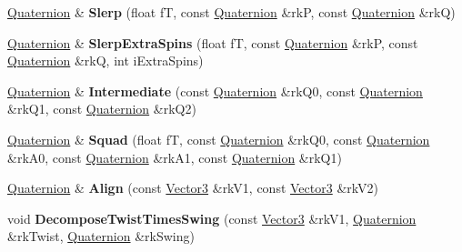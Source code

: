 \begin{DoxyCompactItemize}
\item 
\hyperlink{class_magnum_1_1_quaternion}{Quaternion} \& {\bfseries Slerp} (float fT, const \hyperlink{class_magnum_1_1_quaternion}{Quaternion} \&rkP, const \hyperlink{class_magnum_1_1_quaternion}{Quaternion} \&rkQ)\hypertarget{class_magnum_1_1_quaternion_af89b7c1613042ea126c8ff2a08284bac}{}\label{class_magnum_1_1_quaternion_af89b7c1613042ea126c8ff2a08284bac}

\item 
\hyperlink{class_magnum_1_1_quaternion}{Quaternion} \& {\bfseries Slerp\+Extra\+Spins} (float fT, const \hyperlink{class_magnum_1_1_quaternion}{Quaternion} \&rkP, const \hyperlink{class_magnum_1_1_quaternion}{Quaternion} \&rkQ, int i\+Extra\+Spins)\hypertarget{class_magnum_1_1_quaternion_a6c5399620b6a242c6e46f4db73788404}{}\label{class_magnum_1_1_quaternion_a6c5399620b6a242c6e46f4db73788404}

\item 
\hyperlink{class_magnum_1_1_quaternion}{Quaternion} \& {\bfseries Intermediate} (const \hyperlink{class_magnum_1_1_quaternion}{Quaternion} \&rk\+Q0, const \hyperlink{class_magnum_1_1_quaternion}{Quaternion} \&rk\+Q1, const \hyperlink{class_magnum_1_1_quaternion}{Quaternion} \&rk\+Q2)\hypertarget{class_magnum_1_1_quaternion_a7c13c49551714c6366075112eccaebf3}{}\label{class_magnum_1_1_quaternion_a7c13c49551714c6366075112eccaebf3}

\item 
\hyperlink{class_magnum_1_1_quaternion}{Quaternion} \& {\bfseries Squad} (float fT, const \hyperlink{class_magnum_1_1_quaternion}{Quaternion} \&rk\+Q0, const \hyperlink{class_magnum_1_1_quaternion}{Quaternion} \&rk\+A0, const \hyperlink{class_magnum_1_1_quaternion}{Quaternion} \&rk\+A1, const \hyperlink{class_magnum_1_1_quaternion}{Quaternion} \&rk\+Q1)\hypertarget{class_magnum_1_1_quaternion_a312369b567fdf89cbb0b285e5f2ef710}{}\label{class_magnum_1_1_quaternion_a312369b567fdf89cbb0b285e5f2ef710}

\item 
\hyperlink{class_magnum_1_1_quaternion}{Quaternion} \& {\bfseries Align} (const \hyperlink{class_magnum_1_1_vector3}{Vector3} \&rk\+V1, const \hyperlink{class_magnum_1_1_vector3}{Vector3} \&rk\+V2)\hypertarget{class_magnum_1_1_quaternion_a68451a14da45bedae3297da18d24f50b}{}\label{class_magnum_1_1_quaternion_a68451a14da45bedae3297da18d24f50b}

\item 
void {\bfseries Decompose\+Twist\+Times\+Swing} (const \hyperlink{class_magnum_1_1_vector3}{Vector3} \&rk\+V1, \hyperlink{class_magnum_1_1_quaternion}{Quaternion} \&rk\+Twist, \hyperlink{class_magnum_1_1_quaternion}{Quaternion} \&rk\+Swing)\hypertarget{class_magnum_1_1_quaternion_a2d4d5110c6a7aa48bd3bc5f29a3395ca}{}\label{class_magnum_1_1_quaternion_a2d4d5110c6a7aa48bd3bc5f29a3395ca}


\end{DoxyCompactItemize}

